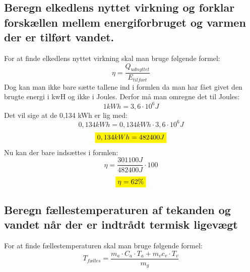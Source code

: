 \subsection{Beregn elkedlens nyttet virkning og forklar forskællen mellem energiforbruget og varmen der er tilført vandet.}
For at finde elkedlens nyttet virkning skal man bruge følgende formel: 
\begin{equation*}
    \eta=\frac{Q_{udnyttet}}{E_{tilført}}
\end{equation*}
Dog kan man ikke bare sætte tallene ind i formlen da man har fået givet den brugte energi i kwH og ikke i Joules. 
Derfor må man omregne det til Joules:
\begin{equation*}
    1 kWh=3,6 \cdot 10^6 J
\end{equation*}
Det vil sige at de 0,134 kWh er lig med:
\begin{equation*}
    0,134 kWh=0,134 kWh \cdot 3,6 \cdot 10^6 J
\end{equation*}
\begin{equation*}
    \mathcolorbox{yellow}{0,134 kWh=482400 J}
\end{equation*}
Nu kan der bare indsættes i formlen:
\begin{equation*}
    \eta=\frac{301100 J}{482400 J}\cdot 100
\end{equation*}
\begin{equation*}
    \mathcolorbox{yellow}{\eta=62\%}
\end{equation*}

\subsection{Beregn fællestemperaturen af tekanden og vandet når der er indtrådt termisk ligevægt}
For at finde fællestemperaturen skal man bruge følgende formel:
\begin{equation*}
    T_{fælles}= \frac{m_a \cdot C_a \cdot T_a + m_v c_v \cdot T_v}{m_g}
\end{equation*} %